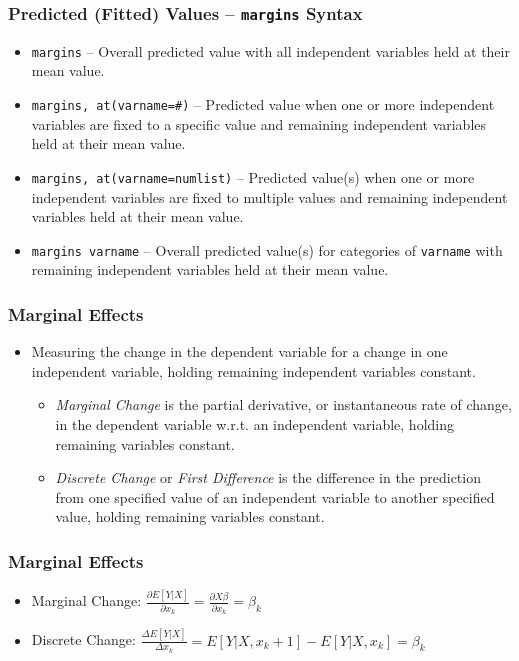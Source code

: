 \documentclass{beamer}
\begin{document}
\begin{frame}
	\frametitle{Predicted (Fitted) Values -- \texttt{margins} Syntax}
	\begin{itemize}
		\item \texttt{margins} -- Overall predicted value with all independent variables held at their mean value.
		\item \texttt{margins, at(varname=\#)} -- Predicted value when one or more independent variables are fixed to a specific value and remaining independent variables held at their mean value.
		\item \texttt{margins, at(varname=numlist)} -- Predicted value(s) when one or more independent variables are fixed to multiple values and remaining independent variables held at their mean value.
		\item \texttt{margins varname} -- Overall predicted value(s) for categories of \texttt{varname} with remaining independent variables held at their mean value.
	\end{itemize}
\end{frame}

\begin{frame}
	\frametitle{Marginal Effects}
	\begin{itemize}
		\item Measuring the change in the dependent variable for a change in one independent variable, holding remaining independent variables constant.
		\begin{itemize}
			\item \textit{Marginal Change} is the partial derivative, or instantaneous rate of change, in the dependent variable w.r.t. an independent variable, holding remaining variables constant.
			\item \textit{Discrete Change} or \textit{First Difference} is the difference in the prediction from one specified value of an independent variable to another specified value, holding remaining variables constant.
		\end{itemize}
	\end{itemize}
\end{frame}

\begin{frame}
	\frametitle{Marginal Effects}
	\begin{itemize}
		\item Marginal Change: $\frac{\partial E[Y|X]}{\partial x_{k}}=\frac{\partial X\beta}{\partial x_{k}}=\beta_{k}$
		\item Discrete Change: $\frac{\Delta E[Y|X]}{\Delta x_{k}}=E[Y|X, x_{k}+1]-E[Y|X, x_{k}]=\beta_{k}$
	\end{itemize}
\end{frame}
\end{document}
